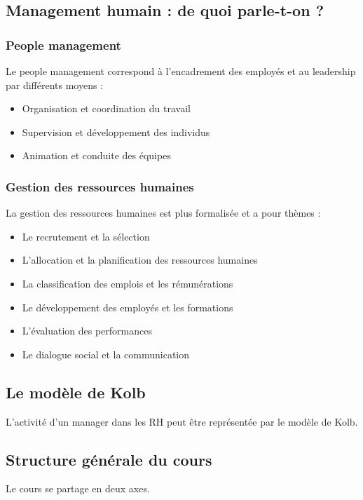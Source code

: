 \documentclass[12pt]{article}
\begin{document}
  \subsection{Management humain : de quoi parle-t-on ?}
    \subsubsection{People management}
      Le people management correspond à l'encadrement des employés et au leadership par différents moyens :
      
      \begin{itemize}
       \item Organisation et coordination du travail
       \item Supervision et développement des individus
       \item Animation et conduite des équipes
      \end{itemize}
    
    \subsubsection{Gestion des ressources humaines}
      
      La gestion des ressources humaines est plus formalisée et a pour thèmes :
      
      \begin{itemize}
       \item Le recrutement et la sélection
       \item L'allocation et la planification des ressources humaines
       \item La classification des emplois et les rémunérations
       \item Le développement des employés et les formations
       \item L'évaluation des performances
       \item Le dialogue social et la communication
      \end{itemize}
      
  \subsection{Le modèle de Kolb}
  
  L'activité d'un manager dans les RH peut être représentée par le modèle de Kolb.
  
  
  \subsection{Structure générale du cours}
    Le cours se partage en deux axes.
    
\end{document}
